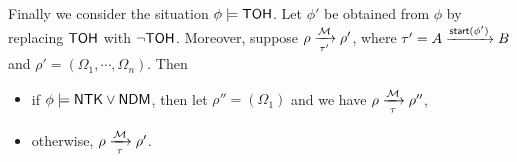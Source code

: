 Finally we consider the situation $\phi \models {\sf TOH}$.
Let $\phi'$ be obtained from $\phi$ by replacing ${\sf TOH}$ with $\neg {\sf TOH}$. Moreover, 
suppose $\rho \xrightarrow [\tau']{{\mathcal{M} }} \rho'$, where $\tau' = A \xrightarrow{{\mathsf{start} }(\phi')} B$ and $\rho' = (\Omega_1, \cdots, \Omega_{n})$. 
Then
\begin{itemize}
\item if $\phi \models {\sf NTK} \vee {\sf NDM}$, then let $\rho'' = (\Omega_1)$ and we have $\rho \xrightarrow [\tau]{{\mathcal{M} }} \rho''$,
%
\item otherwise, $\rho \xrightarrow [\tau]{{\mathcal{M} }} \rho'$.
\end{itemize}


